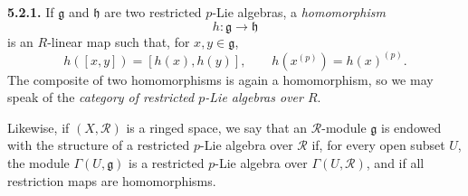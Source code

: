 \medskip
\noindent\textbf{5.2.1.}
\label{sga3:VIIA:5.2.1}
If \(\mathfrak g\) and \(\mathfrak h\) are two restricted
\(p\)-Lie algebras, a \emph{homomorphism}
\[
  h:\mathfrak g\longrightarrow\mathfrak h
\]
is an \(R\)-linear map such that, for \(x,y\in\mathfrak g\),
\[
  h([x,y])=[h(x),h(y)],
  \qquad
  h(x^{(p)})=h(x)^{(p)}.
\]
The composite of two homomorphisms is again a homomorphism, so we
may speak of the \emph{category of restricted \(p\)-Lie algebras
over \(R\)}.

Likewise, if \((X,\mathcal R)\) is a ringed space, we say that an
\(\mathcal R\)-module \(\mathfrak g\) is endowed with the
structure of a restricted \(p\)-Lie algebra over \(\mathcal R\) if,
for every open subset \(U\), the module
\(\Gamma(U,\mathfrak g)\) is a restricted \(p\)-Lie algebra over
\(\Gamma(U,\mathcal R)\), and if all restriction maps are
homomorphisms.

